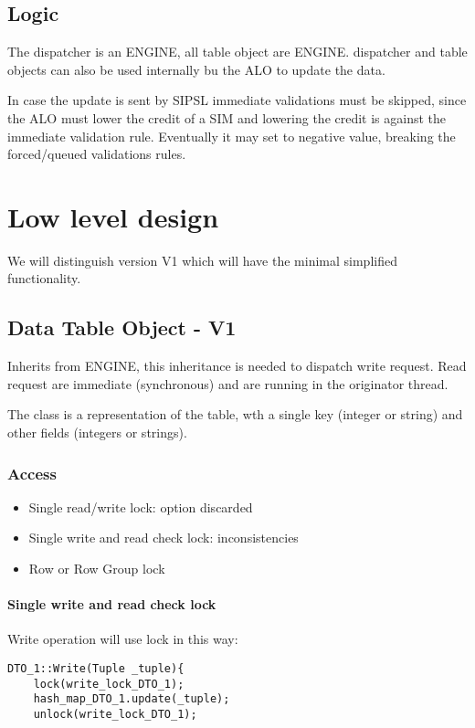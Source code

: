 \documentclass[a4paper]{article}
\begin{document}
\subsection{Logic}

The dispatcher is an ENGINE, all table object are ENGINE.
dispatcher and table objects can also be used internally bu the ALO to update
the data.


In case the update is sent by SIPSL immediate validations must be skipped,
since the ALO must lower the credit of a SIM and lowering the credit is against
the immediate validation rule.
Eventually it may set to negative value, breaking the forced/queued validations
rules.

\section{Low level design}
We will distinguish version V1 which will have the minimal
simplified functionality.
\subsection{Data Table Object - V1}
Inherits from ENGINE, this inheritance is needed to dispatch write request.
Read request are immediate (synchronous) and are running in the originator
thread.

The class is a representation of the table, wth a single key (integer or
string) and other fields (integers or strings).

\subsubsection{Access}
\begin{itemize}
	\item {Single read/write lock: option discarded}
	\item {Single write and read check lock: inconsistencies}
	\item {Row or Row Group lock}
\end{itemize}

\paragraph{Single write and read check lock}
Write operation will use lock in this way:

\begin{verbatim}
DTO_1::Write(Tuple _tuple){
    lock(write_lock_DTO_1);
    hash_map_DTO_1.update(_tuple);
    unlock(write_lock_DTO_1);
\end{verbatim}
\end{document}
